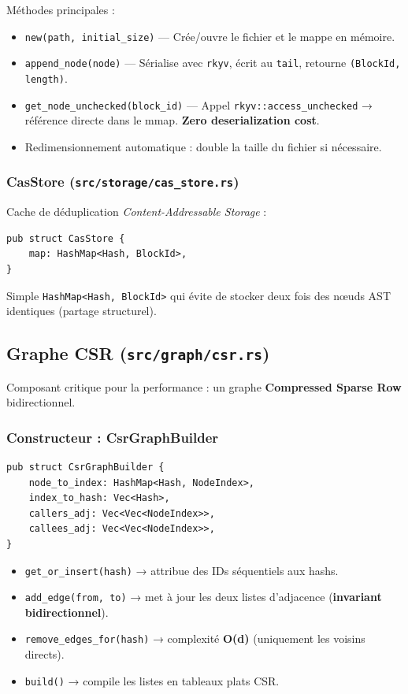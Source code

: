 \documentclass[12pt,a4paper]{article}
\newcommand{\code}[1]{\texttt{#1}}
\begin{document}
Méthodes principales :
\begin{itemize}
    \item \code{new(path, initial\_size)} — Crée/ouvre le fichier et le mappe en mémoire.
    \item \code{append\_node(node)} — Sérialise avec \code{rkyv}, écrit au \code{tail}, retourne \code{(BlockId, length)}.
    \item \code{get\_node\_unchecked(block\_id)} — Appel \code{rkyv::access\_unchecked} → référence directe dans le mmap. \textbf{Zero deserialization cost}.
    \item Redimensionnement automatique : double la taille du fichier si nécessaire.
\end{itemize}

\subsubsection{CasStore (\code{src/storage/cas\_store.rs})}

Cache de déduplication \textit{Content-Addressable Storage} :

\begin{verbatim}
pub struct CasStore {
    map: HashMap<Hash, BlockId>,
}
\end{verbatim}

Simple \code{HashMap<Hash, BlockId>} qui évite de stocker deux fois des nœuds AST identiques (partage structurel).

\subsection{Graphe CSR (\code{src/graph/csr.rs})}

Composant critique pour la performance : un graphe \textbf{Compressed Sparse Row} bidirectionnel.

\subsubsection{Constructeur : CsrGraphBuilder}

\begin{verbatim}
pub struct CsrGraphBuilder {
    node_to_index: HashMap<Hash, NodeIndex>,
    index_to_hash: Vec<Hash>,
    callers_adj: Vec<Vec<NodeIndex>>,
    callees_adj: Vec<Vec<NodeIndex>>,
}
\end{verbatim}

\begin{itemize}
    \item \code{get\_or\_insert(hash)} → attribue des IDs séquentiels aux hashs.
    \item \code{add\_edge(from, to)} → met à jour les deux listes d'adjacence (\textbf{invariant bidirectionnel}).
    \item \code{remove\_edges\_for(hash)} → complexité \textbf{O(d)} (uniquement les voisins directs).
    \item \code{build()} → compile les listes en tableaux plats CSR.
\end{itemize}
\end{document}
